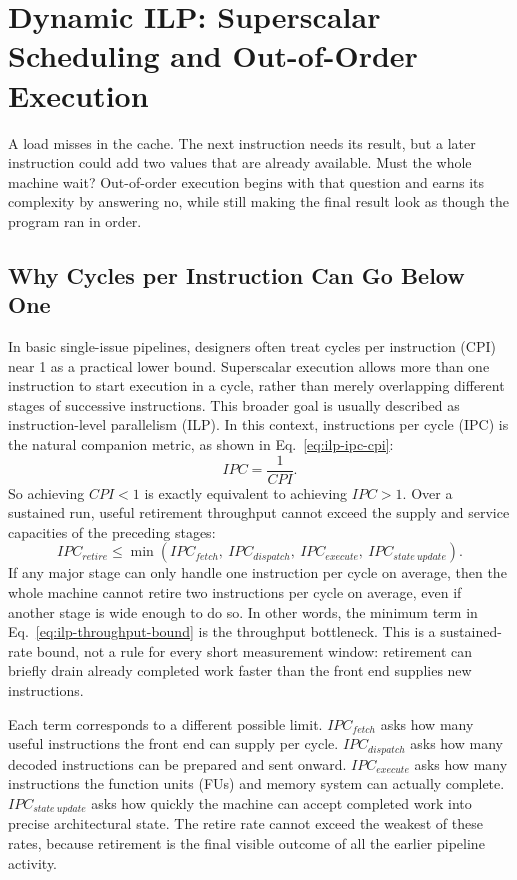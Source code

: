 \chapter[Dynamic ILP and Out-of-Order]{Dynamic ILP: Superscalar Scheduling and Out-of-Order Execution}\label{ch:ilp-superscalar}

A load misses in the cache.
The next instruction needs its result, but a later instruction could add two values that are already available.
Must the whole machine wait?
Out-of-order execution begins with that question and earns its complexity by answering no, while still making the final result look as though the program ran in order.


\section{Why Cycles per Instruction Can Go Below One}\label{sec:ilp-cpi-ipc}
In basic single-issue pipelines, designers often treat cycles per instruction (CPI) near 1 as a practical lower bound.
Superscalar execution allows more than one instruction to start execution in a cycle, rather than merely overlapping different stages of successive instructions.
This broader goal is usually described as instruction-level parallelism (ILP).
In this context, instructions per cycle (IPC) is the natural companion metric, as shown in Eq.~\eqref{eq:ilp-ipc-cpi}:
\begin{equation}\label{eq:ilp-ipc-cpi}
    IPC=\frac{1}{CPI}.
\end{equation}
So achieving $CPI<1$ is exactly equivalent to achieving $IPC>1$.
Over a sustained run, useful retirement throughput cannot exceed the supply and service capacities of the preceding stages:
\begin{equation}\label{eq:ilp-throughput-bound}
    IPC_{retire} \le \min\!\left(IPC_{fetch},\ IPC_{dispatch},\ IPC_{execute},\ IPC_{state\ update}\right).
\end{equation}
If any major stage can only handle one instruction per cycle on average, then the whole machine cannot retire two instructions per cycle on average, even if another stage is wide enough to do so.
In other words, the minimum term in Eq.~\eqref{eq:ilp-throughput-bound} is the throughput bottleneck.
This is a sustained-rate bound, not a rule for every short measurement window: retirement can briefly drain already completed work faster than the front end supplies new instructions.

Each term corresponds to a different possible limit.
$IPC_{fetch}$ asks how many useful instructions the front end can supply per cycle.
$IPC_{dispatch}$ asks how many decoded instructions can be prepared and sent onward.
$IPC_{execute}$ asks how many instructions the function units (FUs) and memory system can actually complete.
$IPC_{state\ update}$ asks how quickly the machine can accept completed work into precise architectural state.
The retire rate cannot exceed the weakest of these rates, because retirement is the final visible outcome of all the earlier pipeline activity.


